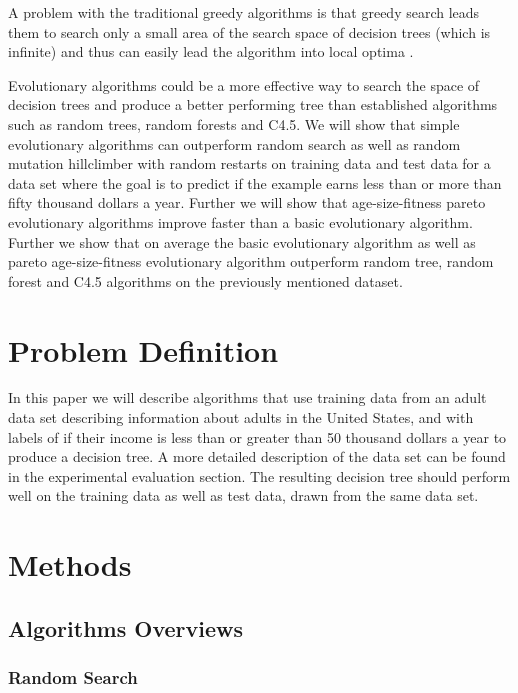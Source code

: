 \documentclass{acm_proc_article-sp}
\begin{document}
A problem with the traditional greedy algorithms is that greedy search leads them to search only a small area of the search space of decision trees (which is infinite) and thus can easily lead the algorithm into local optima \cite{barros2012}.

Evolutionary algorithms could be a more effective way to search the space of decision trees and produce a better performing tree than established algorithms such as random trees, random forests and C4.5. We will show that simple evolutionary algorithms can outperform random search as well as random mutation hillclimber with random restarts on training data and test data for a data set where the goal is to predict if the example earns less than or more than fifty thousand dollars a year. Further we will show that age-size-fitness pareto evolutionary algorithms improve faster than a basic evolutionary algorithm. Further we show that on average the basic evolutionary algorithm as well as pareto age-size-fitness evolutionary algorithm outperform random tree, random forest and C4.5 algorithms on the previously mentioned dataset.

\section{Problem Definition}

In this paper we will describe algorithms that use training data from an adult data set describing information about adults in the United States, and with labels of if their income is less than or greater than 50 thousand dollars a year to produce a decision tree. A more detailed description of the data set can be found in the experimental evaluation section. The resulting decision tree should perform well on the training data as well as test data, drawn from the same data set.

\section{Methods}

\subsection{Algorithms Overviews}

\subsubsection{Random Search}
\end{document}
